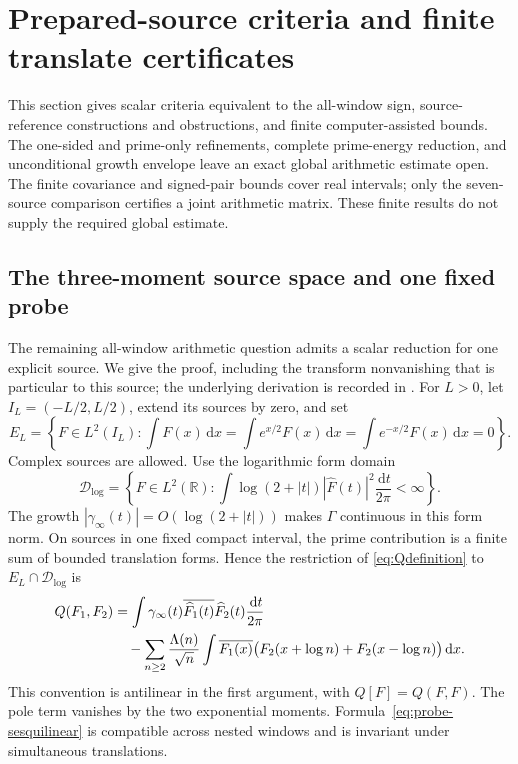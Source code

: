 \documentclass[11pt]{article}
\numberwithin{equation}{section}
\theoremstyle{definition}
\theoremstyle{remark}
\newcommand{\dd}{\,\mathrm d}
\begin{document}
\section{Prepared-source criteria and finite translate certificates}
\label{sec:source-criteria}

This section gives scalar criteria equivalent to the all-window sign,
source-reference constructions and obstructions, and finite
computer-assisted bounds. The one-sided and prime-only refinements,
complete prime-energy reduction, and unconditional growth envelope leave
an exact global arithmetic estimate open. The finite covariance and
signed-pair bounds cover real intervals; only the seven-source comparison
certifies a joint arithmetic matrix. These finite results do not supply
the required global estimate.

\subsection{The three-moment source space and one fixed probe}
\label{sec:probe-setup}

The remaining all-window arithmetic question admits a scalar reduction
for one explicit source. We give the proof, including the transform
nonvanishing that is particular to this source; the underlying
derivation is recorded in \cite{SingleProbeNote}.
For \(L>0\), let \(I_L=(-L/2,L/2)\), extend its sources by zero, and set
\begin{equation}\label{eq:probe-source-space}
E_L=\left\{F\in L^2(I_L):
\int F(x)\dd x=\int e^{x/2}F(x)\dd x
=\int e^{-x/2}F(x)\dd x=0\right\}.
\end{equation}
Complex sources are allowed. Use the logarithmic form domain
\[
\mathcal D_{\log}=
\left\{F\in L^2(\mathbb R):
\int\log(2+|t|)|\widehat F(t)|^2\frac{\dd t}{2\pi}<\infty\right\}.
\]
The growth \(|\gamma_\infty(t)|=O(\log(2+|t|))\) makes
\(\Gamma\) continuous in this form norm. On sources in one fixed
compact interval, the prime contribution is a finite sum of bounded
translation forms. Hence the restriction of \eqref{eq:Qdefinition} to
\(E_L\cap\mathcal D_{\log}\) is
\begin{align}
Q(F_1,F_2)
&=\int\gamma_\infty(t)
\overline{\widehat F_1(t)}\widehat F_2(t)
\frac{\dd t}{2\pi}\notag\\
&\quad-\sum_{n\ge2}\frac{\Lambda(n)}{\sqrt n}
\int\overline{F_1(x)}
\bigl(F_2(x+\log n)+F_2(x-\log n)\bigr)\dd x.
\label{eq:probe-sesquilinear}
\end{align}
This convention is antilinear in the first argument, with
\(Q[F]=Q(F,F)\). The pole term vanishes by the two exponential
moments. Formula~\eqref{eq:probe-sesquilinear} is compatible across
nested windows and is invariant under simultaneous translations.
\end{document}
